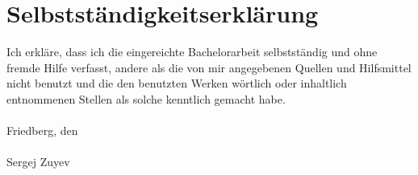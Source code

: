 \chapter*{Selbstständigkeitserklärung}
\label{cha:erklaerung}
\thispagestyle{empty}
%
%
Ich erkläre, dass ich die eingereichte Bachelorarbeit selbstständig und ohne fremde Hilfe verfasst, andere als die von mir angegebenen Quellen und Hilfsmittel nicht benutzt und die den benutzten Werken wörtlich oder inhaltlich entnommenen Stellen als solche kenntlich gemacht habe. \\
%
\vspace{.2cm} \\
\noindent Friedberg, den {} \\
%
\vspace{2cm} \\
\noindent Sergej Zuyev \\
%
%
%
